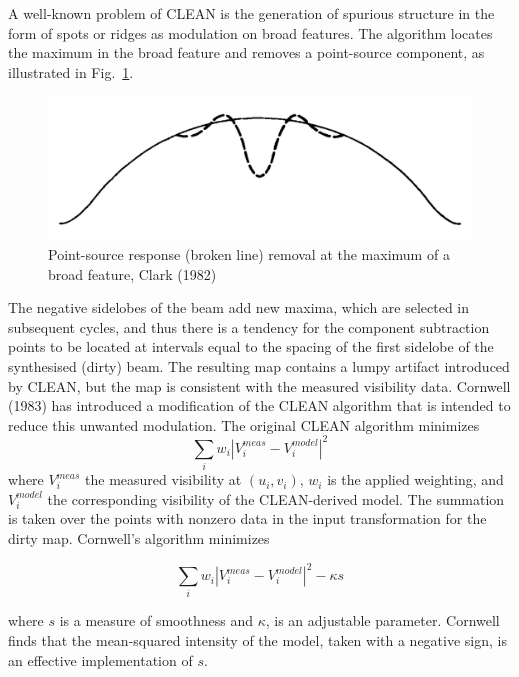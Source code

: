 A well-known problem of CLEAN is the generation of spurious structure in the form of spots or ridges as modulation on broad features. The algorithm locates the maximum in the broad feature and removes a point-source component, as illustrated in Fig.~\ref{fig:clarkSpu}.%
\begin{figure}[h]
        \centering
        \includegraphics[width=\textwidth]{Figures/spurious}
        \caption[Point-source response (broken line) removal at the maximum of a broad feature, Clark (1982)]{Point-source response (broken line) removal at the maximum of a broad feature, Clark (1982)~\citep[Pg.~431,~Fig.~11.2]{thompson2008interferometry}}
		\label{fig:clarkSpu}
\end{figure}

The negative sidelobes of the beam add new maxima, which are selected in subsequent cycles, and thus there is a tendency for the component subtraction points to be located at intervals equal to the spacing of the first sidelobe of the synthesised (dirty) beam. The resulting map contains a lumpy artifact introduced by CLEAN, but the map is consistent with the measured visibility data. Cornwell (1983) has introduced a modification of the CLEAN algorithm that is intended to reduce this unwanted modulation. The original CLEAN algorithm minimizes 
\begin{equation}
\sum_{i}w_i|V^{meas}_{i} - V^{model}_{i}|^2
\end{equation}where $V^{meas}_{i}$ the measured visibility at $(u_i, v_i)$, $w_i$ is the applied weighting, and $V^{model}_{i}$ the corresponding visibility of the CLEAN-derived model. The summation is taken over the points with nonzero data in the input transformation for the dirty map. Cornwell's algorithm minimizes 

\begin{equation}
\sum_{i}w_i|V^{meas}_{i} - V^{model}_{i}|^2 -\kappa{s}
\end{equation}

where $s$ is a measure of smoothness and $\kappa$, is an adjustable parameter. Cornwell finds that the mean-squared intensity of the model, taken with a negative sign, is an effective implementation of $s$.

